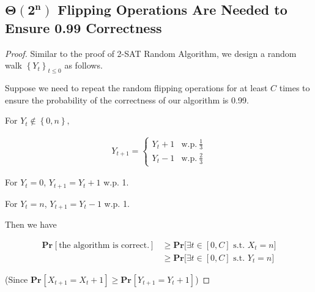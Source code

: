 \documentclass{article}
\renewcommand{\Pr}[2]{\mathbf{Pr}_{#1}\left[#2\right]}
\newcommand{\set}[1]{\left\{#1\right\}}
\begin{document}
\subsection{$\boldsymbol{\Theta(2^n)}$ Flipping Operations Are Needed to Ensure 0.99 Correctness}
\vspace{1em}
\begin{proof}
    Similar to the proof of 2-SAT Random Algorithm, we design a random walk $\left\{Y_t\right\}_{t\le0}$ as follows. 
    
    \hspace{1.3em}
    Suppose we need to repeat the random flipping operations for at least $C$ times to ensure the probability of the correctness of our algorithm is 0.99.
    
    \hspace{1.3em}
    For $Y_t\notin \set{0,n},$
    
    \vspace{-3em}
    \begin{align*}
        Y_{t+1}=\left\{\begin{array}{ll}
            Y_t+1  &  \mathrm{w.p.}\ \frac{1}{3}\\
            Y_t-1  &  \mathrm{w.p.}\ \frac{2}{3}
         \end{array}\right.
    \end{align*}
    
    \vspace{-0.3em} \hspace{1.3em}
    For $Y_t=0$, $Y_{t+1}=Y_t+1$ w.p. 1.
    
    \hspace{1.3em}
    For $Y_t=n$, $Y_{t+1}=Y_t-1$ w.p. 1.
    
    \vspace{1em} \hspace{1.3em}
    Then we have 
    
    \vspace{-3.3em}
    \begin{align*}
        \Pr{}{\text{the algorithm is correct.}}&\geq \mathbf{Pr}\Big[\exists t\in[0,C]\text{ s.t. }X_t=n\Big]\\
        &\geq \mathbf{Pr}\Big[\exists t\in[0,C]\text{ s.t. }Y_t=n\Big]
    \end{align*}
    
    \vspace{-1.2em} \hspace{21em}
    (Since $\Pr{}{X_{t+1}=X_t+1}\geq\Pr{}{Y_{t+1}=Y_t+1}$)
    

\end{proof}
\end{document}
